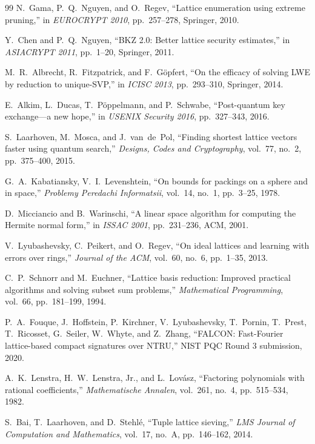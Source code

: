 \documentclass[11pt,a4paper]{article}
\newcommand{\NIST}{\textsf{NIST}\xspace}
\begin{document}
\begin{thebibliography}{99}
N.~Gama, P.~Q.~Nguyen, and O.~Regev, ``Lattice enumeration using extreme pruning,'' in \emph{EUROCRYPT 2010}, pp.~257--278, Springer, 2010.

Y.~Chen and P.~Q.~Nguyen, ``BKZ 2.0: Better lattice security estimates,'' in \emph{ASIACRYPT 2011}, pp.~1--20, Springer, 2011.

M.~R.~Albrecht, R.~Fitzpatrick, and F.~G\"opfert, ``On the efficacy of solving LWE by reduction to unique-SVP,'' in \emph{ICISC 2013}, pp.~293--310, Springer, 2014.

E.~Alkim, L.~Ducas, T.~P\"oppelmann, and P.~Schwabe, ``Post-quantum key exchange---a new hope,'' in \emph{USENIX Security 2016}, pp.~327--343, 2016.

S.~Laarhoven, M.~Mosca, and J.~van~de~Pol, ``Finding shortest lattice vectors faster using quantum search,'' \emph{Designs, Codes and Cryptography}, vol.~77, no.~2, pp.~375--400, 2015.

G.~A.~Kabatiansky, V.~I.~Levenshtein, ``On bounds for packings on a sphere and in space,'' \emph{Problemy Peredachi Informatsii}, vol.~14, no.~1, pp.~3--25, 1978.

D.~Micciancio and B.~Warinschi, ``A linear space algorithm for computing the Hermite normal form,'' in \emph{ISSAC 2001}, pp.~231--236, ACM, 2001.

V.~Lyubashevsky, C.~Peikert, and O.~Regev, ``On ideal lattices and learning with errors over rings,'' \emph{Journal of the ACM}, vol.~60, no.~6, pp.~1--35, 2013.

C.~P.~Schnorr and M.~Euchner, ``Lattice basis reduction: Improved practical algorithms and solving subset sum problems,'' \emph{Mathematical Programming}, vol.~66, pp.~181--199, 1994.

P.~A.~Fouque, J.~Hoffstein, P.~Kirchner, V.~Lyubashevsky, T.~Pornin, T.~Prest, T.~Ricosset, G.~Seiler, W.~Whyte, and Z.~Zhang, ``FALCON: Fast-Fourier lattice-based compact signatures over NTRU,'' \NIST PQC Round 3 submission, 2020.

A.~K.~Lenstra, H.~W.~Lenstra, Jr., and L.~Lov\'asz, ``Factoring polynomials with rational coefficients,'' \emph{Mathematische Annalen}, vol.~261, no.~4, pp.~515--534, 1982.

S.~Bai, T.~Laarhoven, and D.~Stehl\'e, ``Tuple lattice sieving,'' \emph{ LMS Journal of Computation and Mathematics}, vol.~17, no.~A, pp.~146--162, 2014.


\end{thebibliography}
\end{document}

